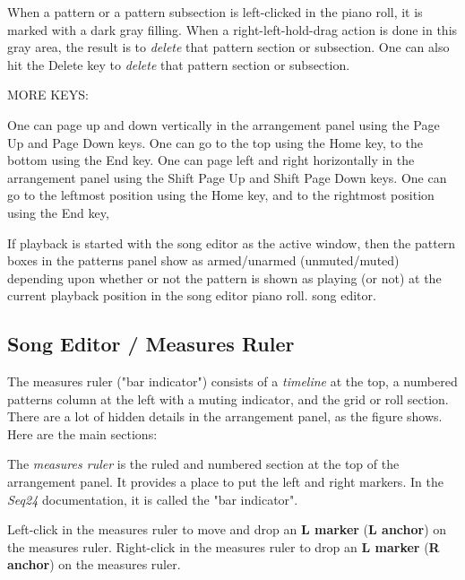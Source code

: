    When a pattern or a pattern subsection is left-clicked in the piano
   roll, it is marked with a dark gray filling.
   When a right-left-hold-drag action is done in this gray area, the result
   is to \textsl{delete} that pattern section or subsection.
   One can also hit the Delete key to \textsl{delete} that pattern section
   or subsection.

   MORE KEYS:

   One can page up and down vertically in the arrangement
   panel using the
    Page Up and 
    Page Down keys.
   One can go to the top using the 
    Home key,
   to the bottom using the
    End key.
   One can page left and right horizontally in the arrangement
   panel using the
    Shift Page Up and 
    Shift Page Down keys.
   One can go to the leftmost position using the 
    Home key,
   and to the rightmost position using the
    End key,

   If playback is started with the song editor as the
   active window, then the pattern boxes in the patterns panel
   show as armed/unarmed (unmuted/muted) depending upon whether or not the
   pattern is shown as playing (or not) at the current playback position in
   the song editor piano roll.
   song editor.

\subsection{Song Editor / Measures Ruler}
\label{subsec:song_editor_measures_ruler}

   The measures ruler ("bar indicator")
   consists of a \textsl{timeline} at the top, a
   numbered patterns column at the left with a muting indicator, and the
   grid or roll section.  There are a lot of hidden details in the
   arrangement panel, as the figure shows.  Here are the main sections:

   The \textsl{measures ruler} is the ruled and numbered section at the top
   of the arrangement panel.  It provides a place to put the left and right
   markers.  In the \textsl{Seq24} documentation, it is called the "bar
   indicator".

   Left-click in the measures ruler to move and drop an
   \textbf{L marker} (\textbf{L anchor}) on the measures ruler.
   Right-click in the measures ruler to drop an
   \textbf{L marker} (\textbf{R anchor}) on the measures ruler.

